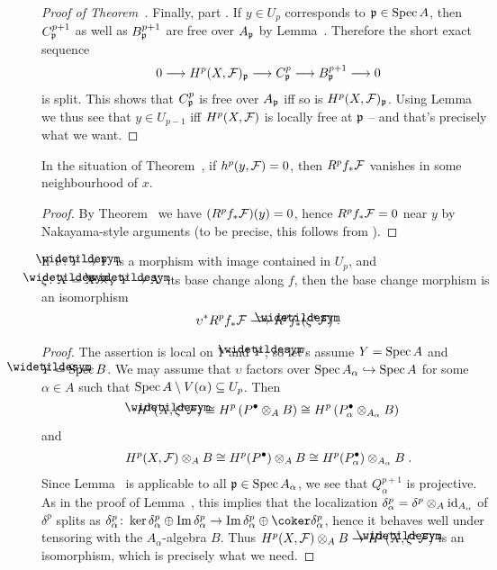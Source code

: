 \documentclass[a4paper,parskip=half,numbers=enddot, DIV=12]{scrreprt}
\begin{document}
\begin{proof}[Proof of Theorem~]
	Finally, part . If $y\in U_p$ corresponds to $\mathfrak{p}\in\operatorname{Spec} A$, then $C_{\mathfrak{p}}^{p+1}$ as well as $B_{\mathfrak{p}}^{p+1}$ are free over $A_{\mathfrak{p}}$ by Lemma~. Therefore the short exact sequence
	\begin{align*}
		0\morphism H^p(X,\Ff)_\pp\morphism C_\pp^p\morphism B_\pp^{p+1}\morphism 0
	\end{align*}
	is split. This shows that $C_{\mathfrak{p}}^p$ is free over $A_{\mathfrak{p}}$ iff so is $H^p(X,\mathcal{F})_{\mathfrak{p}}$. Using Lemma~ we thus see that $y\in U_{p-1}$ iff $H^p(X,\mathcal{F})$ is locally free at $\mathfrak{p}$ -- and that's precisely what we want.
\end{proof}
\begin{cor}
	In the situation of Theorem~, if $h^p(y,\mathcal{F})=0$, then $R^pf_*\mathcal{F}$ vanishes in some neighbourhood of $x$.
\end{cor}
\begin{proof}
	By Theorem~ we have $(R^pf_*\mathcal{F})(y)=0$, hence $R^pf_*\mathcal{F}=0$ near $y$ by Nakayama-style arguments (to be precise, this follows from \cite[Corollary~1.5.1]{alg2}).
\end{proof}
\begin{cor}
	If $\upsilon\colon \snake{Y}\morphism Y$ is a morphism with image contained in $U_p$, and $\xi\colon \snake{X}=X\times_Y\snake{Y}\morphism X$ its base change along $f$, then the base change morphism is an isomorphism
	\begin{align*}
		\upsilon^*R^pf_*\Ff\isomorphism R^p\snake{f}_*(\xi^*\Ff)\;.
	\end{align*}
\end{cor}
\begin{proof}
	The assertion is local on $Y$ and $\snake{Y}$, so let's assume $Y=\operatorname{Spec} A$ and $\snake{Y}=\Spec B$. We may assume that $\upsilon$ factors over $\Spec A_\alpha\monomorphism \Spec A$ for some $\alpha\in A$ such that $\operatorname{Spec} A\setminus V(\alpha)\subseteq U_p$. Then
	\begin{align*}
		H^p(\snake{X},\xi^*\Ff)\cong H^p\left(P^\bullet\otimes_AB\right)\cong H^p\left(P_\alpha^\bullet\otimes_{A_\alpha}B\right)
	\end{align*}
	and
	\begin{align*}
		H^p(X,\mathcal{F})\otimes_AB\cong H^p(P^\bullet)\otimes_AB\cong H^p(P_\alpha^\bullet)\otimes_{A_\alpha}B\;.
	\end{align*}
	Since Lemma~ is applicable to all $\mathfrak{p}\in \operatorname{Spec} A_\alpha$, we see that $Q_\alpha^{p+1}$ is projective. As in the proof of Lemma~, this implies that the localization $\delta_\alpha^p=\delta^p\otimes_A\operatorname{id}_{A_\alpha}$ of $\delta^p$ splits as $\delta_\alpha^p\colon \ker\delta_\alpha^p\oplus \Im \delta_\alpha^p\morphism \Im\delta_\alpha^p\oplus\coker\delta_\alpha^p$, hence it behaves well under tensoring with the $A_\alpha$-algebra $B$. Thus $H^p(X,\Ff)\otimes_AB\morphism H^p(\snake{X},\xi^*\Ff)$ is an isomorphism, which is precisely what we need.
\end{proof}
\end{document}
